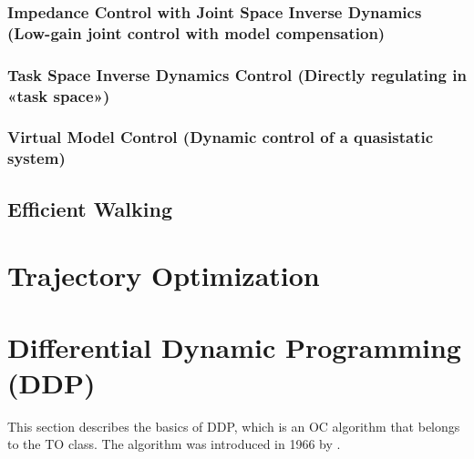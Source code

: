 \subsubsection{Impedance Control with Joint Space Inverse Dynamics (Low-gain joint control with model compensation)}
\subsubsection{Task Space Inverse Dynamics Control (Directly regulating in «task space»)}
\subsubsection{Virtual Model Control (Dynamic control of a quasistatic system)}
\subsection{Efficient Walking}

\section{Trajectory Optimization}

\section{Differential Dynamic Programming (DDP)}
This section describes the basics of DDP, which is an \gls{OC} algorithm that belongs to the \gls{TO} class. The algorithm was introduced in 1966 by \citeauthor{MAYNE1966} \citep{MAYNE1966}.

